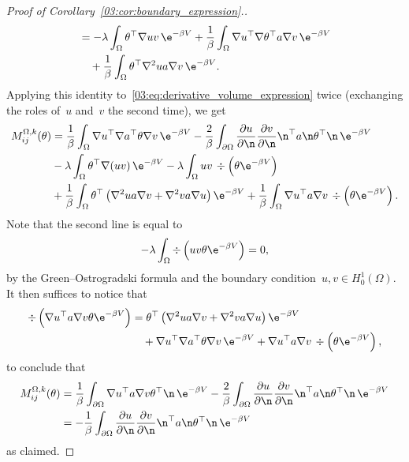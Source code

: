\begin{proof}[Proof of Corollary~\ref{03:cor:boundary_expression}.]
\begin{equation}
\begin{aligned}
        &= -\lambda\int_\Omega \theta^\top \nabla u v\,\e^{-\beta V} + \frac1\beta\int_\Omega \nabla u^\top \nabla\theta^\top a \nabla v\,\e^{-\beta V}\\
        &\quad+\frac1\beta \int_\Omega \theta^\top \nabla^2 u a \nabla v\,\e^{-\beta V}.
        \end{aligned}
    \end{equation}
    Applying this identity to~\eqref{03:eq:derivative_volume_expression} twice (exchanging the roles of~$u$ and~$v$ the second time), we get
    \begin{equation}
        \begin{aligned}
            M_{ij}^{\Omega,k}(\theta) &= \frac1\beta\int_\Omega \nabla u^\top \nabla a^\top \theta\nabla v\,\e^{-\beta V}-\frac2\beta\int_{\partial\Omega}\frac{\partial u}{\partial \n}\frac{\partial v}{\partial\n}\n^\top a\n \theta^\top\n\,\e^{-\beta V}\\
            &-\lambda\int_{\Omega}\theta^\top \nabla(uv)\,\e^{-\beta V}-\lambda\int_{\Omega}uv\,\div\left(\theta\e^{-\beta V}\right)\\
            &+\frac1\beta\int_\Omega\theta^\top\left(\nabla^2 u a\nabla v + \nabla^2 v a \nabla u\right)\e^{-\beta V} + \frac1\beta\int_\Omega \nabla u^\top a \nabla v\,\div\left(\theta\e^{-\beta V}\right).
        \end{aligned}
    \end{equation}
    Note that the second line is equal to
    \[-\lambda\int_\Omega \div\left(uv \theta \e^{-\beta V}\right) = 0,\]
    by the Green--Ostrogradski formula and the boundary condition~$u,v\in H_0^1(\Omega)$.
    It then suffices to notice that
    \begin{equation}
        \begin{split}
            \div\left(\nabla u^\top a \nabla v \theta \e^{-\beta V}\right) &= \theta^\top\left(\nabla^2 u a\nabla v+ \nabla^2 v a \nabla u\right)\e^{-\beta V}\\
            &\quad+ \nabla u^\top \nabla a^\top \theta \nabla v\,\e^{-\beta V} + \nabla u^\top a \nabla v\,\div\left(\theta\e^{-\beta V}\right),
        \end{split}
    \end{equation}
    to conclude that
    \begin{equation}
        \begin{aligned}
            M_{ij}^{\Omega,k}(\theta) &= \frac1\beta \int_{\partial\Omega}\nabla u^\top a \nabla v \theta^\top \n\,\e^{-\beta V} - \frac2\beta \int_{\partial\Omega}\frac{\partial u}{\partial \n}\frac{\partial v}{\partial\n}\n^\top a\n \theta^\top\n\,\e^{-\beta V}\\
            &=-\frac1\beta\int_{\partial\Omega}\frac{\partial u}{\partial \n}\frac{\partial v}{\partial\n}\n^\top a\n \theta^\top\n\,\e^{-\beta V}
        \end{aligned}
    \end{equation}
    as claimed.
\end{proof}

